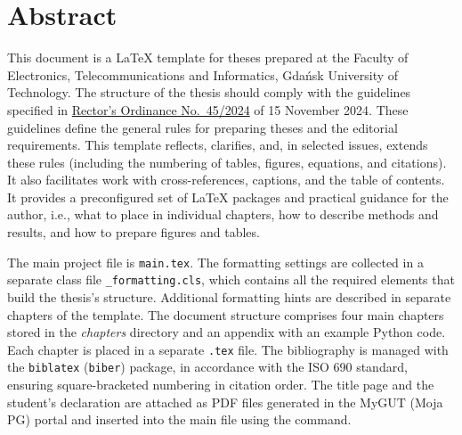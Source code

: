 \chapter*{Abstract}
This document is a \LaTeX{} template for theses prepared at the Faculty of Electronics, Telecommunications and Informatics, Gdańsk University of Technology. The structure of the thesis should comply with the guidelines specified in \href{\detokenize{https://cdn.files.pg.edu.pl/eti/Dziekanat/regulaminy/ZR%2045-2024.pdf}}{Rector’s Ordinance No.~45/2024} of 15 November 2024. These guidelines define the general rules for preparing theses and the editorial requirements. This template reflects, clarifies, and, in selected issues, extends these rules (including the numbering of tables, figures, equations, and citations). It also facilitates work with cross-references, captions, and the table of contents. It provides a preconfigured set of \LaTeX{} packages and practical guidance for the author, i.e., what to place in individual chapters, how to describe methods and results, and how to prepare figures and tables.

The main project file is \texttt{main.tex}. The formatting settings are collected in a separate class file \texttt{\_formatting.cls}, which contains all the required elements that build the thesis's structure. Additional formatting hints are described in separate chapters of the template. The document structure comprises four main chapters stored in the \emph{chapters} directory and an appendix with an example Python code. Each chapter is placed in a separate \texttt{.tex} file. The bibliography is managed with the \texttt{biblatex} (\texttt{biber}) package, in accordance with the ISO 690 standard, ensuring square-bracketed numbering in citation order. The title page and the student's declaration are attached as PDF files generated in the MyGUT (Moja PG) portal and inserted into the main file using the \verb|| command.

